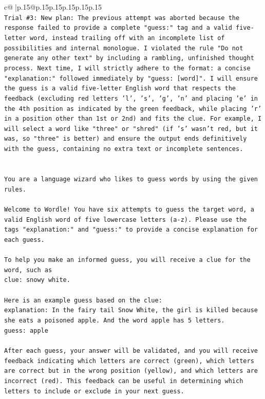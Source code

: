 \documentclass{article}
\begin{document}
{\begin{supertabular}{c@{$\;$}|p{.15\linewidth}@{}p{.15\linewidth}p{.15\linewidth}p{.15\linewidth}p{.15\linewidth}p{.15\linewidth}}
{{{\\ 
\texttt{Trial \#3: New plan: The previous attempt was aborted because the response failed to provide a complete "guess:" tag and a valid five{-}letter word, instead trailing off with an incomplete list of possibilities and internal monologue. I violated the rule "Do not generate any other text" by including a rambling, unfinished thought process. Next time, I will strictly adhere to the format: a concise "explanation:" followed immediately by "guess: {[}word{]}". I will ensure the guess is a valid five{-}letter English word that respects the feedback (excluding red letters 'l', 's', 'g', 'n' and placing 'e' in the 4th position as indicated by the green feedback, while placing 'r' in a position other than 1st or 2nd) and fits the clue. For example, I will select a word like "three" or "shred" (if 's' wasn't red, but it was, so "three" is better) and ensure the output ends definitively with the guess, containing no extra text or incomplete sentences.} \\
\\ 
\\ 
\texttt{You are a language wizard who likes to guess words by using the given rules.} \\
\\ 
\texttt{Welcome to Wordle! You have six attempts to guess the target word, a valid English word of five lowercase letters (a{-}z). Please use the tags "explanation:" and "guess:" to provide a concise explanation for each guess.} \\
\\ 
\texttt{To help you make an informed guess, you will receive a clue for the word, such as} \\
\texttt{clue: snowy white.} \\
\\ 
\texttt{Here is an example guess based on the clue:} \\
\texttt{explanation: In the fairy tail Snow White, the girl is killed because she eats a poisoned apple. And the word apple has 5 letters.} \\
\texttt{guess: apple} \\
\\ 
\texttt{After each guess, your answer will be validated, and you will receive feedback indicating which letters are correct (green), which letters are correct but in the wrong position (yellow), and which letters are incorrect (red). This feedback can be useful in determining which letters to include or exclude in your next guess.} \\
}}}
\end{supertabular}}
\end{document}

